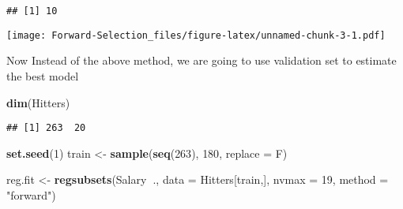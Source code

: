 \documentclass[
]{article}
\newenvironment{Shaded}{\begin{snugshade}}{\end{snugshade}}
\newcommand{\DataTypeTok}[1]{\textcolor[rgb]{0.13,0.29,0.53}{#1}}
\newcommand{\DecValTok}[1]{\textcolor[rgb]{0.00,0.00,0.81}{#1}}
\newcommand{\KeywordTok}[1]{\textcolor[rgb]{0.13,0.29,0.53}{\textbf{#1}}}
\newcommand{\NormalTok}[1]{#1}
\newcommand{\OperatorTok}[1]{\textcolor[rgb]{0.81,0.36,0.00}{\textbf{#1}}}
\newcommand{\StringTok}[1]{\textcolor[rgb]{0.31,0.60,0.02}{#1}}
\begin{document}
\begin{Shaded}
\end{Shaded}

\begin{verbatim}
## [1] 10
\end{verbatim}

\begin{Shaded}
\end{Shaded}

\texttt{[image: Forward-Selection\_files/figure-latex/unnamed-chunk-3-1.pdf]}

Now Instead of the above method, we are going to use validation set to
estimate the best model

\begin{Shaded}
\begin{Highlighting}[]
\KeywordTok{dim}\NormalTok{(Hitters)}
\end{Highlighting}
\end{Shaded}

\begin{verbatim}
## [1] 263  20
\end{verbatim}

\begin{Shaded}
\begin{Highlighting}[]
\KeywordTok{set.seed}\NormalTok{(}\DecValTok{1}\NormalTok{)}
\NormalTok{train <-}\StringTok{ }\KeywordTok{sample}\NormalTok{(}\KeywordTok{seq}\NormalTok{(}\DecValTok{263}\NormalTok{), }\DecValTok{180}\NormalTok{, }\DataTypeTok{replace =}\NormalTok{ F)}

\NormalTok{reg.fit <-}\StringTok{ }\KeywordTok{regsubsets}\NormalTok{(Salary}\OperatorTok{~}\NormalTok{., }\DataTypeTok{data =}\NormalTok{ Hitters[train,], }
                      \DataTypeTok{nvmax =} \DecValTok{19}\NormalTok{, }\DataTypeTok{method =} \StringTok{"forward"}\NormalTok{)}
\end{Highlighting}
\end{Shaded}
\end{document}
